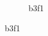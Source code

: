 \begin{figure}[!t]
\begin{subfigure}[t]{0.32\linewidth}
  	\caption{b3f1}
  	\label{fig:b3f1}
 \end{subfigure}
  \end{figure}








